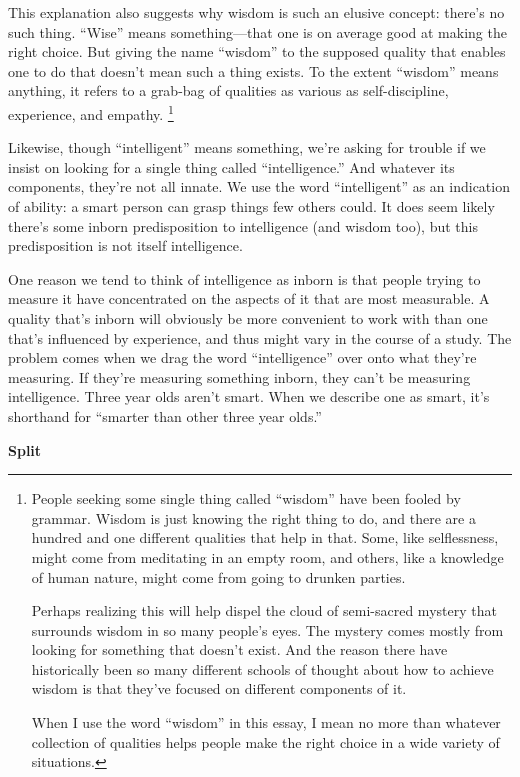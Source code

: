 \documentclass[12pt]{book}
\begin{document}
This explanation also suggests why wisdom is such an elusive concept:
there's no such thing. ``Wise'' means something---that one is on average
good at making the right choice. But giving the name ``wisdom'' to the
supposed quality that enables one to do that doesn't mean such a thing
exists. To the extent ``wisdom'' means anything, it refers to a grab-bag
of qualities as various as self-discipline, experience, and empathy.
\footnote{People seeking some single thing called ``wisdom'' have been
fooled by grammar. Wisdom is just knowing the right thing to do, and
there are a hundred and one different qualities that help in that. Some,
like selflessness, might come from meditating in an empty room, and
others, like a knowledge of human nature, might come from going to
drunken parties.

Perhaps realizing this will help dispel the cloud of semi-sacred mystery
that surrounds wisdom in so many people's eyes. The mystery comes mostly
from looking for something that doesn't exist. And the reason there have
historically been so many different schools of thought about how to
achieve wisdom is that they've focused on different components of it.

When I use the word ``wisdom'' in this essay, I mean no more than
whatever collection of qualities helps people make the right choice in a
wide variety of situations.}

Likewise, though ``intelligent'' means something, we're asking for
trouble if we insist on looking for a single thing called
``intelligence.'' And whatever its components, they're not all innate.
We use the word ``intelligent'' as an indication of ability: a smart
person can grasp things few others could. It does seem likely there's
some inborn predisposition to intelligence (and wisdom too), but this
predisposition is not itself intelligence.

One reason we tend to think of intelligence as inborn is that people
trying to measure it have concentrated on the aspects of it that are
most measurable. A quality that's inborn will obviously be more
convenient to work with than one that's influenced by experience, and
thus might vary in the course of a study. The problem comes when we drag
the word ``intelligence'' over onto what they're measuring. If they're
measuring something inborn, they can't be measuring intelligence. Three
year olds aren't smart. When we describe one as smart, it's shorthand
for ``smarter than other three year olds.''

\textbf{Split}
\end{document}
